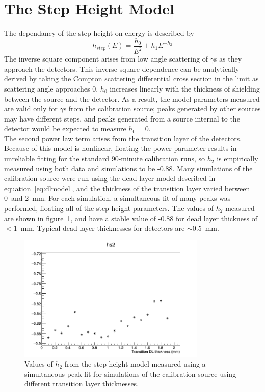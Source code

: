 \documentclass[/main.tex]{subfiles}
\begin{document}
\section{The Step Height Model} \label{sec:stepheight}
The dependancy of the step height on energy is described by
\begin{equation}
  h_{step}(E) = \frac{h_0}{E^2} + h_1E^{-h_2}
\end{equation}
The inverse square component arises from low angle scattering of $\gamma$s as they approach the detectors.
This inverse square dependence can be analytically derived by taking the Compton scattering differential cross section in the limit as scattering angle approaches 0\cite{2016Oberer}.
$h_0$ increases linearly with the thickness of shielding between the source and the detector.
As a result, the model parameters measured are valid only for $\gamma$s from the calibration source; peaks generated by other sources may have different steps, and peaks generated from a source internal to the detector would be expected to measure $h_0=0$.
\\
The second power law term arises from the transition layer of the detectors.
Because of this model is nonlinear, floating the power parameter results in unreliable fitting for the standard 90-minute calibration runs, so $h_2$ is empirically measured using both data and simulations to be -0.88.
Many simulations of the  calibration source were run using the dead layer model described in equation~\ref{eq:dlmodel}, and the thickness of the transition layer varied between 0~and 2~mm.
For each simulation, a simultaneous fit of many peaks was performed, floating all of the step height parameters.
The values of $h_2$ measured are shown in figure~\ref{fig:stepheightpars_sim}, and have a stable value of -0.88 for dead layer thickness of $<1$~mm.
Typical dead layer thicknesses for detectors are $\sim0.5$~mm.
\begin{figure}[h]
  \centering
  \includegraphics[width=0.8\textwidth]{hs2_tl}
  \caption[Simulated dependance of $h_2$ on transition layer thickness] {\label{fig:stepheightpars_sim}
    Values of $h_2$ from the step height model measured using a simultaneous peak fit for simulations of the  calibration source using different transition layer thicknesses.
  }
\end{figure}
\end{document}

